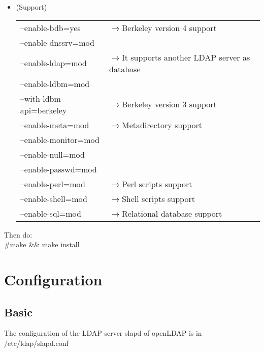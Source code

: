 \begin{itemize}
\item[](Support)\\
\begin{tabular}{|ll|}\hline
--enable-bdb=yes & $\rightarrow$Berkeley version 4 support\\
--enable-dnssrv=mod & \\
--enable-ldap=mod & $\rightarrow$It supports another LDAP server as database\\
--enable-ldbm=mod & \\
--with-ldbm-api=berkeley & $\rightarrow$Berkeley version 3 support\\
--enable-meta=mod & $\rightarrow$Metadirectory support\\
--enable-monitor=mod & \\
--enable-null=mod & \\
--enable-passwd=mod & \\
--enable-perl=mod & $\rightarrow$Perl scripts support\\
--enable-shell=mod & $\rightarrow$Shell scripts support\\
--enable-sql=mod & $\rightarrow$Relational database support\\
\hline \end{tabular}
\end{itemize}

Then do:\\
\#make \&\& make install 
\newpage
\section{Configuration}
\subsection{Basic}

\noindent The configuration of the LDAP server slapd of openLDAP is in /etc/ldap/slapd.conf 

